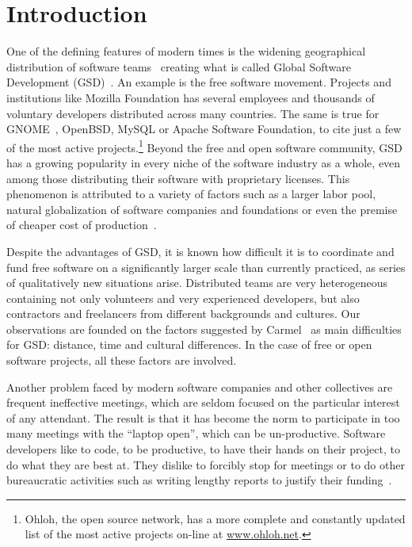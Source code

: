 \documentclass{article}
\newcommand{\indraftnote}[1]{}
\newcommand{\todo}[1]{\indraftnote{todo: #1}}
\begin{document}



\section{Introduction}

One of the defining features of modern times is the widening geographical
distribution of software teams~\cite{last2003} creating what is called Global
Software Development (GSD)~\cite{german2003,Fryer,Begel}.  
An example is the free software movement. Projects and institutions like Mozilla
Foundation has several employees and thousands of voluntary developers
distributed across many countries. The same is true for GNOME~\cite{german2003},
OpenBSD, MySQL or Apache Software Foundation, to cite just a 
few of the most active projects.\footnote{Ohloh, the open source network, has a more complete
and constantly updated list of the most active projects on-line at
\url{www.ohloh.net}.} Beyond the free and open software community, GSD has a growing
popularity in every niche of the software industry as a whole, even among those
distributing their software with proprietary licenses. This phenomenon is
attributed to a variety of factors such as a larger labor pool, natural
globalization of software companies and foundations or even the premise of
cheaper cost of production~\cite{komi2005}.

Despite the advantages of GSD, it is known how
difficult it is to coordinate and fund free software on a significantly larger scale
than currently practiced, as series of qualitatively new situations arise. Distributed
teams are very heterogeneous containing not only volunteers and very experienced
developers, but also contractors and freelancers from different backgrounds and
cultures. Our observations are founded on the factors suggested by
Carmel~\cite{carmel1999} as main difficulties for GSD: distance, time and
cultural differences. In the case of free or open software projects, all these
factors are involved.

Another problem faced by modern software companies and other
collectives are frequent ineffective meetings, which are seldom
focused on the particular interest of any attendant. The result is that it has
become the norm to participate in too many meetings with the ``laptop
open'', which can be un-productive. Software developers
like to code, to be productive, to have their hands on their project,
to do what they are best at. They dislike to forcibly stop for meetings
or to do other bureaucratic activities such as writing lengthy reports to
justify their funding~\cite{Thompson:Wired:2012}.
\end{document}
